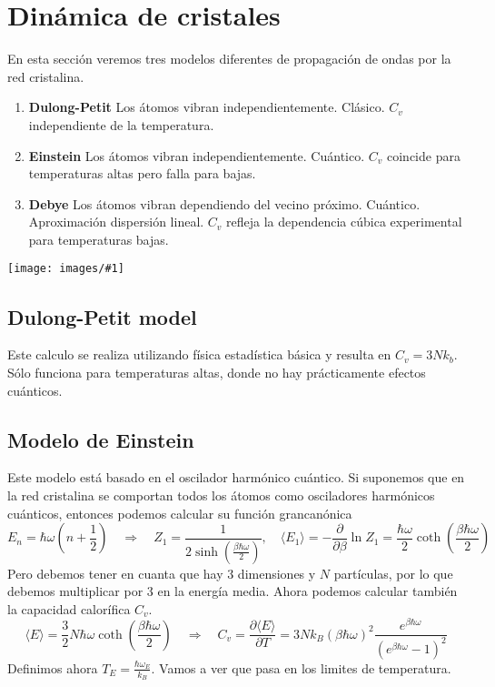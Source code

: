 \documentclass[leqno]{article}
\newcommand{\incimg}[1]{%
\center
\texttt{[image: images/\#1]}
}
\begin{document}
\section{Dinámica de cristales}
En esta sección veremos tres modelos diferentes de propagación de ondas por la red cristalina.

\begin{minipage}{0.6\textwidth}
\begin{enumerate}[topsep=-6pt, itemsep=0pt]
  \item \textbf{Dulong-Petit} Los átomos vibran independientemente. Clásico. $C_v$ independiente de la temperatura.
  \item \textbf{Einstein} Los átomos vibran independientemente. Cuántico. $C_v$ coincide para temperaturas altas pero falla para bajas.
  \item \textbf{Debye} Los átomos vibran dependiendo del vecino próximo. Cuántico. Aproximación dispersión lineal. $C_v$ refleja la dependencia cúbica experimental para temperaturas bajas.
\end{enumerate}
\end{minipage}
\begin{minipage}{0.4\textwidth}
\incimg{comparisoncv.jpg}
\end{minipage}

\subsection{Dulong-Petit model}
Este calculo se realiza utilizando física estadística básica y resulta en $C_v = 3Nk_b$. Sólo funciona para temperaturas altas, donde no hay prácticamente efectos cuánticos.

\subsection{Modelo de Einstein}
Este modelo está basado en el oscilador harmónico cuántico. Si suponemos que en la red cristalina se comportan todos los átomos como osciladores harmónicos cuánticos, entonces podemos calcular su función grancanónica
\[
  E_n = \hbar \omega (n+\frac{1}{2}) \quad \Rightarrow \quad Z_1 = \frac{1}{2 \sinh(\frac{\beta \hbar \omega }{2})}, \quad \langle E_1 \rangle = - \frac{\partial }{\partial \beta } \ln Z_1 = \frac{\hbar\omega }{2} \coth \left( \frac{\beta \hbar \omega }{2} \right) 
\] 
Pero debemos tener en cuanta que hay 3 dimensiones y $N$ partículas, por lo que debemos multiplicar por 3 en la energía media. Ahora podemos calcular también la capacidad calorífica $C_v$.
 \[
\langle E\rangle = \frac{3}{2} N \hbar \omega \coth \left( \frac{\beta \hbar \omega  }{2} \right) \quad \Rightarrow \quad
C_v = \frac{\partial \langle E\rangle}{\partial T}  = 3Nk_B (\beta \hbar \omega )^2 \frac{e^{\beta \hbar \omega }}{(e^{\beta \hbar \omega }-1)^2}
\] 
Definimos ahora $T_E = \frac{\hbar \omega_E}{k_B}$. Vamos a ver que pasa en los limites de temperatura.
\end{document}
